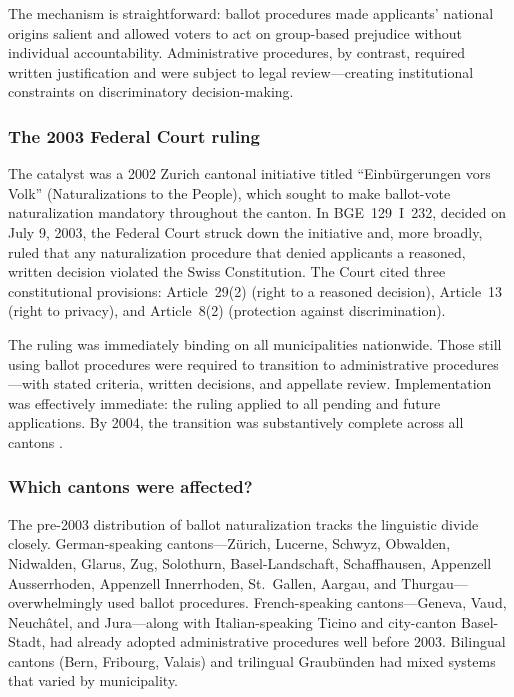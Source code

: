 \documentclass[12pt]{article}
\begin{document}
The mechanism is straightforward: ballot procedures made applicants' national origins salient and allowed voters to act on group-based prejudice without individual accountability. Administrative procedures, by contrast, required written justification and were subject to legal review---creating institutional constraints on discriminatory decision-making.

\subsubsection*{The 2003 Federal Court ruling} The catalyst was a 2002 Zurich cantonal initiative titled ``Einb\"{u}rgerungen vors Volk'' (Naturalizations to the People), which sought to make ballot-vote naturalization mandatory throughout the canton. In BGE~129~I~232, decided on July 9, 2003, the Federal Court struck down the initiative and, more broadly, ruled that any naturalization procedure that denied applicants a reasoned, written decision violated the Swiss Constitution. The Court cited three constitutional provisions: Article~29(2) (right to a reasoned decision), Article~13 (right to privacy), and Article~8(2) (protection against discrimination).

The ruling was immediately binding on all municipalities nationwide. Those still using ballot procedures were required to transition to administrative procedures---with stated criteria, written decisions, and appellate review. Implementation was effectively immediate: the ruling applied to all pending and future applications. By 2004, the transition was substantively complete across all cantons \citep{helbling2010}.

\subsubsection*{Which cantons were affected?} The pre-2003 distribution of ballot naturalization tracks the linguistic divide closely. German-speaking cantons---Z\"{u}rich, Lucerne, Schwyz, Obwalden, Nidwalden, Glarus, Zug, Solothurn, Basel-Landschaft, Schaffhausen, Appenzell Ausserrhoden, Appenzell Innerrhoden, St.~Gallen, Aargau, and Thurgau---overwhelmingly used ballot procedures. French-speaking cantons---Geneva, Vaud, Neuch\^{a}tel, and Jura---along with Italian-speaking Ticino and city-canton Basel-Stadt, had already adopted administrative procedures well before 2003. Bilingual cantons (Bern, Fribourg, Valais) and trilingual Graub\"{u}nden had mixed systems that varied by municipality.
\end{document}
